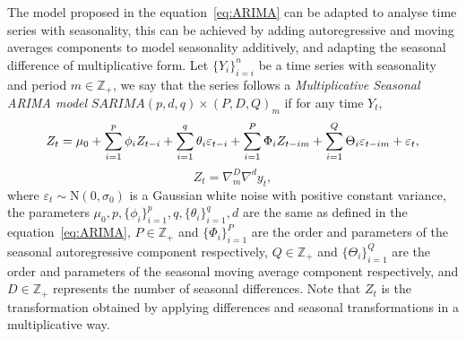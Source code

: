 The model proposed in the equation~\ref{eq:ARIMA} can be adapted to analyse time series with seasonality, this can be achieved by adding autoregressive  and moving averages components to model seasonality additively, and adapting the seasonal difference of multiplicative form. Let $\{Y_i \}_{i=i}^n $ be a time series with seasonality and period $m \in \mathbb{Z_+}$, we say that the series follows a \textit{Multiplicative Seasonal ARIMA model} $SARIMA (p, d, q) \times (P, D, Q)_m$ if for any time $Y_t$,
%
\begin{equation}\label{eq:SARIMA}
	\small Z_t  = \mu_0 + \sum_{i=1}^p \phi_i Z_{t-i} +\sum_{i=1}^q \theta_i \varepsilon_{t-i} + \sum_{i=1}^P \Phi_i Z_{t-im} + \sum_{i=1}^Q \Theta_i \varepsilon_{t-im}+ \varepsilon_t,
\end{equation}
%
$$Z_t = \nabla_m^D\nabla^d y_t,$$
%
where $\varepsilon_t \sim \text{N}(0, \sigma_0)$ is a Gaussian white noise with positive constant variance, the parameters $\mu_0, p, \{\phi_i \}_{i = 1}^p, q, \{\theta_i \}_{i=1}^q, d$ are the same as defined in the equation~\ref{eq:ARIMA}, $P \in \mathbb{Z}_+$ and $\{\Phi_i \}_{i=1}^P$ are the order and parameters of the seasonal autoregressive component respectively, $Q \in \mathbb{Z}_+$ and $\{\Theta_i \}_{i=1}^Q$ are the order and parameters of the seasonal moving average component respectively, and $D \in \mathbb{Z}_+$ represents the number of seasonal differences. Note that $Z_t$ is the transformation obtained by applying differences and seasonal transformations in a multiplicative way.
%
